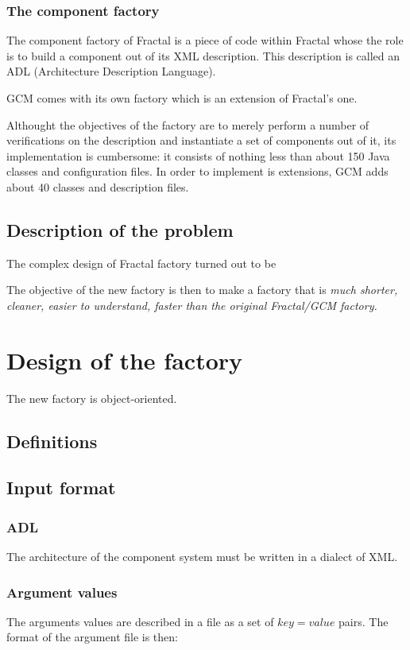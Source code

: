 \documentclass{article}
\begin{document}
\subsubsection{The component factory}
The component factory of Fractal is a piece of code within Fractal whose the role  is to build a component out of its XML description. This description
is called an ADL (Architecture Description Language).


GCM comes with its own factory which is an extension of Fractal's one.

Althought the objectives of the factory are to merely perform a number of verifications
on the description and instantiate a set of components out of it, its implementation is cumbersome: it consists of nothing
less than about 150 Java classes and configuration files.
In order to implement is extensions, GCM adds about 40 classes and description files.


\subsection{Description of the problem}
The complex design of Fractal factory turned out to be 

The objective of the new factory is then to make a factory that is \em{much} shorter, cleaner,
easier to understand, faster than the original Fractal/GCM factory.

\section{Design of the factory}
The new factory is object-oriented.

\subsection{Definitions}


\subsection{Input format}
\subsubsection{ADL}
The architecture of the component system must be written in a dialect of XML.

\subsubsection{Argument values}
The arguments values are described in a file as a set of $key=value$ pairs. The format
of the argument file is then:
\end{document}

